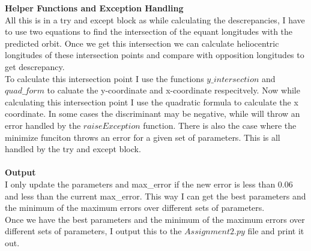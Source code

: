 \documentclass[12pt]{article}
\begin{document}
\textbf{Helper Functions and Exception Handling}\\
All this is in a try and except block as while calculating the descrepancies, I have to use two equations to find the intersection of the equant longitudes with the predicted orbit. Once we get this intersection we can calculate heliocentric longitudes of these intersection points and compare with opposition longitudes to get descrepancy. \\ To calculate this intersection point I use the functions $y\_intersection$ and $quad\_form$ to caluate the y-coordinate and x-coordinate respecitvely. Now while calculating this intersection point I use the quadratic formula to calculate the x coordinate. In some cases the discriminant may be negative, while will throw an error handled by the $raiseException$ function. There is also the case where the minimize funciton throws an error for a given set of parameters. This is all handled by the try and except block.\\ \\
\textbf{Output}\\
I only update the parameters and max\_error if the new error is less than 0.06 and less than the current max\_error. This way I can get the best parameters and the minimum of the maximum errors over different sets of parameters. \\
Once we have the best parameters and the minimum of the maximum errors over different sets of parameters, I output this to the $Assignment2.py$ file and print it out.\\
\end{document}
